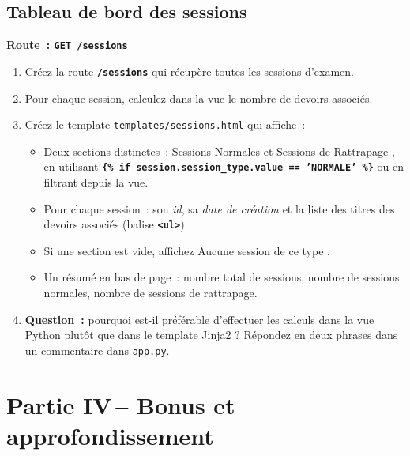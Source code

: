 \documentclass[12pt,a4paper]{article}
\newcommand{\fichier}[1]{\texttt{\textcolor{primary}{#1}}}
\newcommand{\kw}[1]{\texttt{\textbf{#1}}}
\begin{document}
\subsection{Tableau de bord des sessions}

\begin{mdframed}[style=exercice]
\textbf{Route~: \texttt{GET /sessions}}

\begin{enumerate}[label=\textbf{\arabic*.}]
    \item Créez la route \kw{/sessions} qui récupère toutes les sessions d'examen.
    \item Pour chaque session, calculez dans la vue le nombre de devoirs associés.
    \item Créez le template \fichier{templates/sessions.html} qui affiche~:
    \begin{itemize}
        \item Deux sections distinctes~: \og Sessions Normales \fg{} et \og Sessions de Rattrapage \fg{},
        en utilisant \kw{\{\% if session.session\_type.value == 'NORMALE' \%\}} ou en filtrant depuis la vue.
        \item Pour chaque session~: son \textit{id}, sa \textit{date de création} et la liste des titres des devoirs associés (balise \kw{<ul>}).
        \item Si une section est vide, affichez \og Aucune session de ce type \fg{}.
        \item Un résumé en bas de page~: nombre total de sessions, nombre de sessions normales, nombre de sessions de rattrapage.
    \end{itemize}
    \item \textbf{Question~:} pourquoi est-il préférable d'effectuer les calculs dans la vue Python plutôt que dans le template Jinja2 ? Répondez en deux phrases dans un commentaire dans \fichier{app.py}.
\end{enumerate}
\end{mdframed}

\section{Partie IV\,– Bonus et approfondissement}
\end{document}
